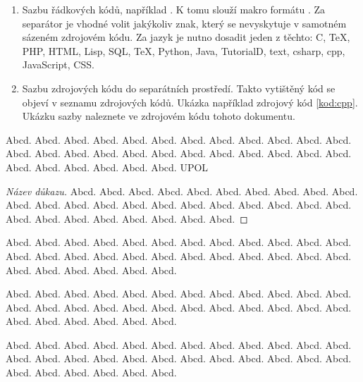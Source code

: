 \documentclass[
  biblatex,
  figures=false,
  glossaries,
  index
]{kidiplom}
\begin{document}
\begin{enumerate}
\item Sazbu řádkových kódů, například . K tomu slouží makro formátu . Za separátor je vhodné volit jakýkoliv znak, který se nevyskytuje v samotném sázeném zdrojovém kódu. Za jazyk je nutno dosadit jeden z těchto: C, TeX, PHP, HTML, Lisp, SQL, TeX, Python, Java, TutorialD, text, csharp, cpp, JavaScript, CSS.

\item Sazbu zdrojových kódu do separátních prostředí. Takto vytištěný kód se objeví v seznamu zdrojových kódů. Ukázka například zdrojový kód \ref{kod:cpp}. Ukázku sazby naleznete ve zdrojovém kódu tohoto dokumentu.
\end{enumerate}


\begin{definition}
Abcd. Abcd. Abcd. Abcd. Abcd. Abcd. Abcd. Abcd. Abcd. Abcd. Abcd. Abcd. Abcd. Abcd. Abcd. Abcd. Abcd. Abcd. Abcd. Abcd. Abcd. Abcd. Abcd. Abcd. Abcd. Abcd. Abcd. Abcd. Abcd. Abcd. \gls{UPOL}
\end{definition}

\begin{proof}[Název důkazu]
Abcd. Abcd. Abcd. Abcd. Abcd. Abcd. Abcd. Abcd. Abcd. Abcd. Abcd. Abcd. Abcd. Abcd. Abcd. Abcd. Abcd. Abcd. Abcd. Abcd. Abcd. Abcd. Abcd. Abcd. Abcd. Abcd. Abcd. Abcd. Abcd. Abcd.
\end{proof}

\begin{remark}
Abcd. Abcd. Abcd. Abcd. Abcd. Abcd. Abcd. Abcd. Abcd. Abcd. Abcd. Abcd. Abcd. Abcd. Abcd. Abcd. Abcd. Abcd. Abcd. Abcd. Abcd. Abcd. Abcd. Abcd. Abcd. Abcd. Abcd. Abcd. Abcd. Abcd.
\end{remark}

\begin{example}
Abcd. Abcd. Abcd. Abcd. Abcd. Abcd. Abcd. Abcd. Abcd. Abcd. Abcd. Abcd. Abcd. Abcd. Abcd. Abcd. Abcd. Abcd. Abcd. Abcd. Abcd. Abcd. Abcd. Abcd. Abcd. Abcd. Abcd. Abcd. Abcd. Abcd.
\end{example}

\begin{lemma}
Abcd. Abcd. Abcd. Abcd. Abcd. Abcd. Abcd. Abcd. Abcd. Abcd. Abcd. Abcd. Abcd. Abcd. Abcd. Abcd. Abcd. Abcd. Abcd. Abcd. Abcd. Abcd. Abcd. Abcd. Abcd. Abcd. Abcd. Abcd. Abcd. Abcd.
\end{lemma}
\end{document}
